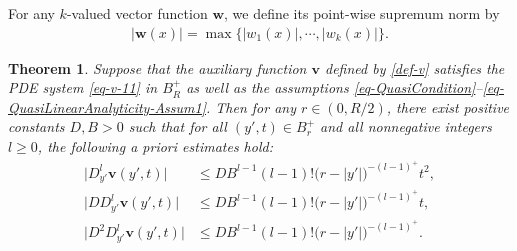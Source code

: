 \documentclass[11pt,reqno]{amsart}
\renewcommand{\leq}{\leqslant}
\renewcommand{\geq}{\geqslant}
\newtheorem{theorem}{Theorem}[section]
\theoremstyle{definition}
\numberwithin{equation}{section}
\begin{document}
For any $k$-valued vector function $\mathbf{w}$, we define its point-wise supremum norm by
\begin{align}
    |\mathbf w(x)| = \max\{|w_1(x)|,\cdots, |w_k(x)|\}.
\end{align}

\begin{theorem}\label{thm-Tan-Ana}
    Suppose that the auxiliary function $\mathbf{v}$ defined by \eqref{def-v} satisfies the PDE system \eqref{eq-v-11} in $B^+_R$ as well as the assumptions \eqref{eq-QuasiCondition}--\eqref{eq-QuasiLinearAnalyticity-Assum1}. 
    Then for any $r\in (0, R/2)$, there exist positive constants $D, B>0$ such that for all $(y',t) \in B^+_r$ and all nonnegative integers $l\geq 0$, the following a priori estimates hold:
    \begin{align}\label{eq-Tan-Ana-1}
        \bigl| D_{y'}^l  \mathbf{v}(y',t)\bigr|& \leq DB^{l-1}(l-1)!\bigl(r - |y'|\bigr)^{-(l-1)^+} t^2,\\\label{eq-Tan-Ana-2}
        \bigl| D D_{y'}^l \mathbf{v}(y',t) \bigr| &\leq DB^{l-1}(l-1)!\bigl(r - |y'|\bigr)^{-(l-1)^+} t,\\\label{eq-Tan-Ana-3}
        \bigl|D^2 D_{y'}^l \mathbf{v}(y',t)\bigr| &\leq DB^{l-1}(l-1)!\bigl(r - |y'|\bigr)^{-(l-1)^+}.
    \end{align}
\end{theorem}
\end{document}
